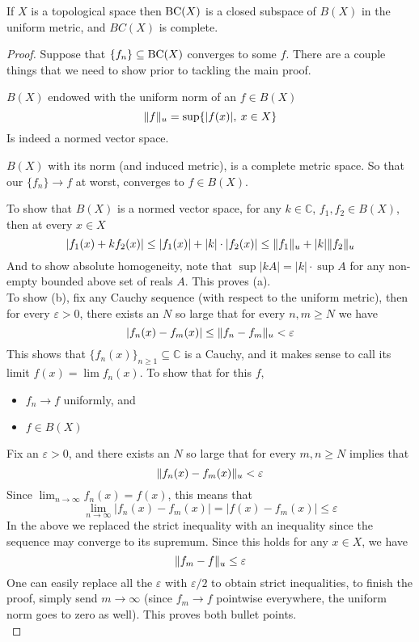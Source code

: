 \documentclass[../../main.tex]{subfiles}
\begin{document}
\begin{wts}
If $X$ is a topological space then $\operatorname{BC}({X})$ is a closed subspace of $B(X)$ in the uniform metric, and $BC(X)$ is complete.
\end{wts}
\begin{proof}
Suppose that $\{f_n\}\subseteq\operatorname{BC}({X})$ converges to some $f$. There are a couple things that we need to show prior to tackling the main proof.
\begin{enumalpha}
    \item $B(X)$ endowed with the uniform norm of an $f\in B(X)$
    \[
    \lVert {f} \rVert_u = \sup \{|f(x)|,\: x\in X\}
    \]
    Is indeed a normed vector space.
    \item $B(X)$ with its norm (and induced metric), is a complete metric space. So that our $\{f_n\}\to f$ at worst, converges to $f\in B(X)$.
\end{enumalpha}
    To show that $B(X)$ is a normed vector space, for any $k\in \mathbb{C}$, $f_1, f_2\in B(X)$, then at every $x\in X$
    \[
    |f_1(x) + kf_2(x)|\leq |f_1(x)| + |k|\cdot|f_2(x)|\leq \lVert {f_1} \rVert_u + |k|\lVert {f_2} \rVert_u
    \]
    And to show absolute homogeneity, note that $\sup{|kA|} = |k|\cdot\sup{A}$ for any non-empty bounded above set of reals $A$. This proves (a).\\
    
    To show (b), fix any Cauchy sequence (with respect to the uniform metric), then for every $\varepsilon>0$, there exists an $N$ so large that for every $n,m\geq N$ we have
    \[
    |f_n(x)-f_m(x)|\leq \lVert {f_n-f_m} \rVert_u<\varepsilon
    \]
    This shows that $\{f_n(x)\}_{n\geq 1}\subseteq \mathbb{C}$ is a Cauchy, and it makes sense to call its limit $f(x) = \lim f_n(x)$. To show that for this $f$,
    \begin{itemize}
        \item $f_n\to f$ uniformly, and
        \item $f\in B(X)$
    \end{itemize}
    Fix an $\varepsilon>0$, and there exists an $N$ so large that for every $m, n\geq N$ implies that
    \[
    \lVert {f_n(x)-f_m(x)} \rVert_u < \varepsilon
    \]
    Since $\lim_{n\to\infty}f_n(x) = f(x)$, this means that
    \[
    \lim_{n\to\infty}|f_n(x)-f_m(x)|=|f(x)-f_m(x)|\leq\varepsilon
    \]
    In the above we replaced the strict inequality with an inequality since the sequence may converge to its supremum. Since this holds for any $x\in X$, we have
    \[
    \lVert {f_m-f} \rVert_u\leq\varepsilon
    \]
    One can easily replace all the $\varepsilon$ with $\varepsilon/2$ to obtain strict inequalities, to finish the proof, simply send $m\to\infty$ (since $f_m\to f$ pointwise everywhere, the uniform norm goes to zero as well). This proves both bullet points.\\
    

\end{proof}
\end{document}
